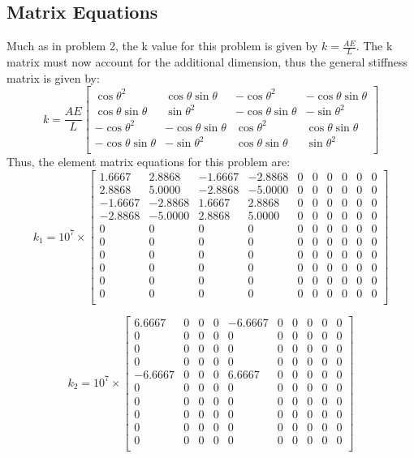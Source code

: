 \documentclass[8pt]{article}
\begin{document}
\subsection{Matrix Equations}
Much as in problem 2, the k value for this problem is given by \(k=\frac{AE}{L}\). The k matrix must now account for the additional dimension, thus the general stiffness matrix is given by:
\[
k=\frac{AE}{L}
\begin{bmatrix}
    \cos\theta^2 & \cos\theta\sin\theta & -\cos\theta^2 & -\cos\theta\sin\theta \\
    \cos\theta\sin\theta & \sin\theta^2 & -\cos\theta\sin\theta & -\sin\theta^2 \\
    -\cos\theta^2 & -\cos\theta\sin\theta & \cos\theta^2 & \cos\theta\sin\theta \\
    -\cos\theta\sin\theta & -\sin\theta^2 & \cos\theta\sin\theta & \sin\theta^2 \\
\end{bmatrix}
\]
Thus, the element matrix equations for this problem are:
\[
k_1 = 10^7 \times
\begin{bmatrix}
1.6667 & 2.8868 & -1.6667 & -2.8868 & 0 & 0 & 0 & 0 & 0 & 0 \\
2.8868 & 5.0000 & -2.8868 & -5.0000 & 0 & 0 & 0 & 0 & 0 & 0 \\
-1.6667 & -2.8868 & 1.6667 & 2.8868 & 0 & 0 & 0 & 0 & 0 & 0 \\
-2.8868 & -5.0000 & 2.8868 & 5.0000 & 0 & 0 & 0 & 0 & 0 & 0 \\
0 & 0 & 0 & 0 & 0 & 0 & 0 & 0 & 0 & 0 \\
0 & 0 & 0 & 0 & 0 & 0 & 0 & 0 & 0 & 0 \\
0 & 0 & 0 & 0 & 0 & 0 & 0 & 0 & 0 & 0 \\
0 & 0 & 0 & 0 & 0 & 0 & 0 & 0 & 0 & 0 \\
0 & 0 & 0 & 0 & 0 & 0 & 0 & 0 & 0 & 0 \\
0 & 0 & 0 & 0 & 0 & 0 & 0 & 0 & 0 & 0 \\
\end{bmatrix}
\]

\[
k_2 = 10^7 \times
\begin{bmatrix}
6.6667 & 0 & 0 & 0 & -6.6667 & 0 & 0 & 0 & 0 & 0 \\
0 & 0 & 0 & 0 & 0 & 0 & 0 & 0 & 0 & 0 \\
0 & 0 & 0 & 0 & 0 & 0 & 0 & 0 & 0 & 0 \\
0 & 0 & 0 & 0 & 0 & 0 & 0 & 0 & 0 & 0 \\
-6.6667 & 0 & 0 & 0 & 6.6667 & 0 & 0 & 0 & 0 & 0 \\
0 & 0 & 0 & 0 & 0 & 0 & 0 & 0 & 0 & 0 \\
0 & 0 & 0 & 0 & 0 & 0 & 0 & 0 & 0 & 0 \\
0 & 0 & 0 & 0 & 0 & 0 & 0 & 0 & 0 & 0 \\
0 & 0 & 0 & 0 & 0 & 0 & 0 & 0 & 0 & 0 \\
0 & 0 & 0 & 0 & 0 & 0 & 0 & 0 & 0 & 0 \\
\end{bmatrix}
\]
\end{document}

